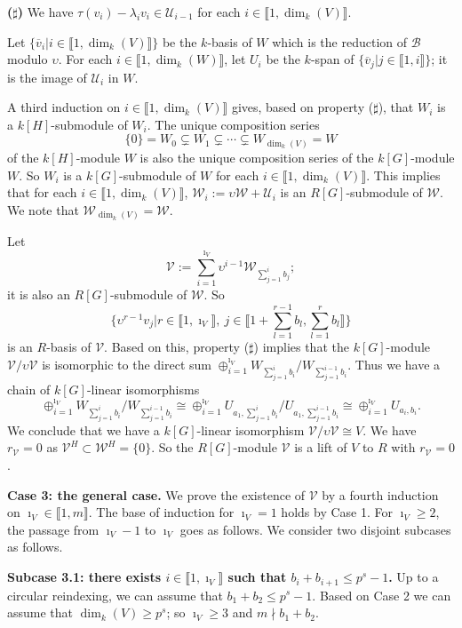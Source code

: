 \documentclass[11pt]{amsart}
\begin{document}
\medskip
{\bf ($\sharp$)} We have $\tau(v_i)-\lambda_iv_i\in\mathcal U_{i-1}$ for each $i\in\llbracket1,\dim_k(V)\rrbracket$.

\medskip
Let $\{\overline{v}_i|i\in\llbracket1,\dim_k(V)\rrbracket\}$ be the $k$-basis of $W$ which is the reduction of $\mathcal B$ modulo $\upsilon$. For each $i\in\llbracket1,\dim_k(W)\rrbracket$, let $U_i$ be the $k$-span of $\{\overline{v}_j|j\in\llbracket1,i\rrbracket\}$; it is the image of $\mathcal U_i$ in $W$. 

A third induction on $i\in\llbracket1,\dim_k(V)\rrbracket$ gives, based on property ($\sharp$), that $W_i$ is a $k[H]$-submodule of $W_i$. The unique composition series 
$$\{0\}=W_0\subsetneq W_1\subsetneq\cdots\subsetneq W_{\dim_k(V)}=W$$
of the $k[H]$-module $W$ is also the unique composition series of the $k[G]$-module $W$. So $W_i$ is a $k[G]$-submodule of $W$ for each $i\in\llbracket1,\dim_k(V)\rrbracket$. This implies that for each $i\in\llbracket1,\dim_k(V)\rrbracket$, $\mathcal W_i:=\upsilon\mathcal W+\mathcal U_i$ is an $R[G]$-submodule of $\mathcal W$. We note that $\mathcal W_{\dim_k(V)}=\mathcal W$. 

Let 
$$\mathcal V:=\sum_{i=1}^{\imath_V} \upsilon^{i-1} \mathcal W_{\sum_{j=1}^i b_j};$$ 
it is also an $R[G]$-submodule of $\mathcal W$. So 
$$\{\upsilon^{r-1}v_j|r\in\llbracket1,\imath_V\rrbracket,\ j\in\llbracket1+\sum_{l=1}^{r-1}b_l,\sum_{l=1}^r b_l\rrbracket\}$$ 
is an $R$-basis of $\mathcal V$. Based on this, property ($\sharp$) implies that the $k[G]$-module $\mathcal V/\upsilon\mathcal V$ is isomorphic to the direct sum $\oplus_{i=1}^{\imath_V} W_{\sum_{j=1}^i b_i} /W_{\sum_{j=1}^{i-1} b_i}$. Thus we have a chain of $k[G]$-linear isomorphisms 
$$\oplus_{i=1}^{\imath_V} W_{\sum_{j=1}^i b_i} /W_{\sum_{j=1}^{i-1} b_i}\cong \oplus_{i=1}^{\imath_V} U_{a_1,\sum_{j=1}^i b_i} /U_{a_1,\sum_{j=1}^{i-1} b_i}\cong \oplus_{i=1}^{\imath_V} U_{a_i,b_i}.$$ 
We conclude that we have a $k[G]$-linear isomorphism $\mathcal V/\upsilon\mathcal V\cong V$. We have $r_{\mathcal V}=0$ as $\mathcal V^H\subset \mathcal W^H=\{0\}$. So the $R[G]$-module $\mathcal V$ is a lift of $V$ to $R$ with $r_{\mathcal V}=0$.

{\bf Case 3: the general case.} We prove the existence of $\mathcal V$ by a fourth induction on $\imath_V\in\llbracket1,m\rrbracket$. The base of induction for $\imath_V=1$ holds by Case 1. For $\imath_V\ge 2$, the passage from $\imath_V-1$ to $\imath_V$ goes as follows. We consider two disjoint subcases as follows.

{\bf Subcase 3.1: there exists $i\in\llbracket1,\imath_V\rrbracket$ such that $b_i+b_{i+1}\le p^s-1$.} Up to a circular reindexing, we can assume that $b_1+b_2\le p^s-1$. Based on Case 2 we can assume that $\dim_k(V)\ge p^s$; so $\imath_V\ge 3$ and $m\nmid b_1+b_2$. 
\end{document}
